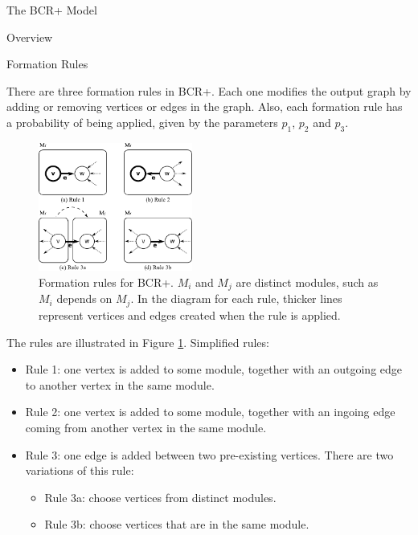 \documentclass[11pt,twocolumn,a4paper,english]{article}
\begin{document}
\begin{section}{The BCR+ Model}
\begin{subsection}{Overview}
\end{subsection}	

\begin{subsection}{Formation Rules}
	
	There are three formation rules in BCR+. Each one modifies the output graph by adding or removing vertices or edges in the graph. Also, each formation rule has a probability of being applied, given by the parameters $p_1$, $p_2$ and $p_3$.

\begin{figure}[htbp]
	\centering
		\includegraphics[width=0.45\textwidth]{figures/bcr-rules}
	\caption{Formation rules for BCR+. $M_i$ and $M_j$ are distinct modules, such as $M_i$ depends on $M_j$. In the diagram for each rule, thicker lines represent vertices and edges created when the rule is applied.}
	\label{fig:bcr-rules}
\end{figure}

	The rules are illustrated in Figure \ref{fig:bcr-rules}. Simplified rules:
	
	\begin{itemize}
		\item Rule 1: one vertex is added to some module, together with an outgoing edge to another vertex in the same module.
		\item Rule 2: one vertex is added to some module, together with an ingoing edge coming from another vertex in the same module.
		\item Rule 3: one edge is added between two pre-existing vertices. There are two variations of this rule:
		\begin{itemize}
			\item Rule 3a: choose vertices from distinct modules.
			\item Rule 3b: choose vertices that are in the same module.
		\end{itemize}
	\end{itemize}
	
	

\end{subsection}
\end{section}
\end{document}

